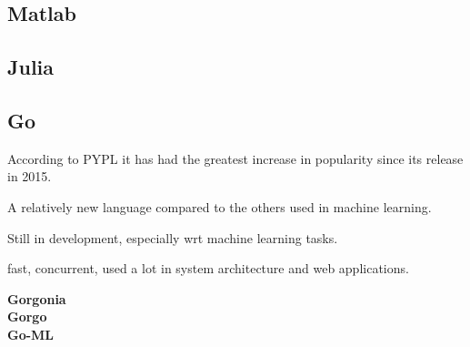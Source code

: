 \subsection{Matlab}

\subsection{Julia}

\subsection{Go}
According to PYPL it has had the greatest increase in popularity since its release in 2015.

A relatively new language compared to the others used in machine learning.

Still in development, especially wrt machine learning tasks.\

fast, concurrent, used a lot in system architecture and web applications.

\textbf{Gorgonia}\\
\textbf{Gorgo}\\
\textbf{Go-ML}\\


